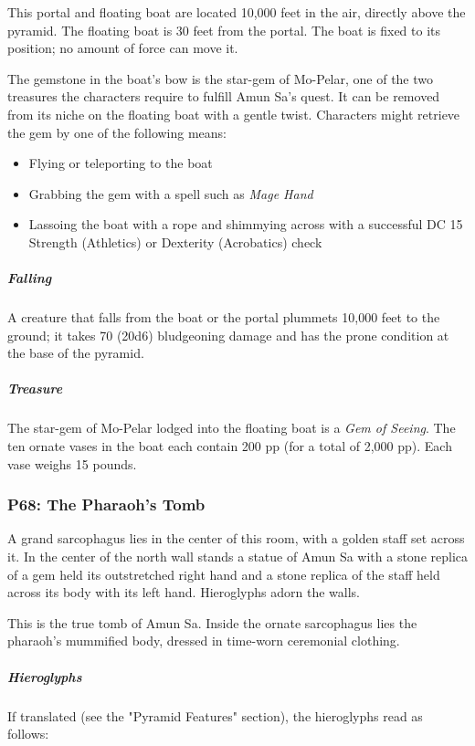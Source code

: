 \documentclass[10pt,a4paper,twoside,bg=print,twocolumn,openany,nodeprecatedcode]{dndbook}
\begin{document}
This portal and floating boat are located 10,000 feet in the air, directly above the pyramid. The floating boat is 30 feet from the portal. The boat is fixed to its position; no amount of force can move it.

The gemstone in the boat's bow is the star-gem of Mo-Pelar, one of the two treasures the characters require to fulfill Amun Sa's quest. It can be removed from its niche on the floating boat with a gentle twist. Characters might retrieve the gem by one of the following means:


\begin{itemize}
\item Flying or teleporting to the boat
\item Grabbing the gem with a spell such as \textit{Mage Hand}
\item Lassoing the boat with a rope and shimmying across with a successful DC 15 Strength (Athletics) or Dexterity (Acrobatics) check
\end{itemize}

\subparagraph{Falling}
A creature that falls from the boat or the portal plummets 10,000 feet to the ground; it takes 70 (20d6) bludgeoning damage and has the prone condition at the base of the pyramid.

\subparagraph{Treasure}
The star-gem of Mo-Pelar lodged into the floating boat is a \textit{Gem of Seeing}. The ten ornate vases in the boat each contain 200 pp (for a total of 2,000 pp). Each vase weighs 15 pounds.

\subsubsection{P68: The Pharaoh's Tomb}
\begin{DndReadAloud}{}
A grand sarcophagus lies in the center of this room, with a golden staff set across it. In the center of the north wall stands a statue of Amun Sa with a stone replica of a gem held its outstretched right hand and a stone replica of the staff held across its body with its left hand. Hieroglyphs adorn the walls.

\end{DndReadAloud}

This is the true tomb of Amun Sa. Inside the ornate sarcophagus lies the pharaoh's mummified body, dressed in time-worn ceremonial clothing.

\subparagraph{Hieroglyphs}
If translated (see the "Pyramid Features" section), the hieroglyphs read as follows:
\end{document}
